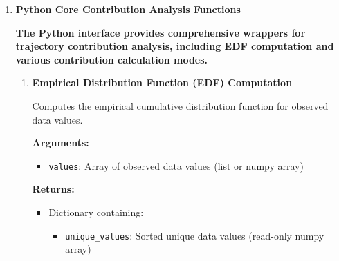 \documentclass[11pt]{article}
\begin{document}
\begin{enumerate}
\begin{itemize}
	      	\item \textbf{Dimension Validation}: Input dimensions and factor mask consistency
	      	      are validated
	      \end{itemize}
	      
	      \textbf{Usage Example:} 
          \begin{lstlisting}[language=Python, caption={Typical Pipeline Usage}]
import numpy as np

# Example data: 10 factors, 100 samples, 50 timepoints
trajectories = np.random.rand(10, 100, 50).astype(np.float64)
factor_mask = np.array([True, True, False, True, True, False, 
    True, True, True, False])
dependent_idx = 5  # 1-based index
mode = 1  # Normal mode
percentile = 95.0

# Process with per-timepoint thresholds
results = tox_process_trajectories(
    trajectories, factor_mask, dependent_idx, mode, percentile
)

# Process with global threshold  
results_flat = tox_process_trajectories_flat(
    trajectories, factor_mask, dependent_idx, mode, percentile
)
	\end{lstlisting}
	
	\item \textbf{Python Core Contribution Analysis Functions}
	      
	      \textbf{The Python interface provides comprehensive wrappers for
	      	trajectory contribution analysis, including EDF computation and various contribution
	      calculation modes.}
	      
	      \begin{enumerate}
	      	\item \textbf{Empirical Distribution Function (EDF) Computation}
	      	      
	      	      Computes the empirical cumulative distribution function for observed data
	      	      values.
	      	      
	      	      \textbf{Arguments:}
	      	      \begin{itemize}
	      	      	\item \texttt{values}: Array of observed data values (list or numpy
	      	      	      array)
	      	      \end{itemize}
	      	      \textbf{Returns:}
	      	      \begin{itemize}
	      	      	\item Dictionary containing:
	      	      	      \begin{itemize}
	      	      	      	\item \texttt{unique\_values}: Sorted unique data values (read-only
	      	      	      	      numpy array)
	      	      	      	      

\end{itemize}
\end{itemize}
\end{enumerate}
\end{enumerate}
\end{document}
